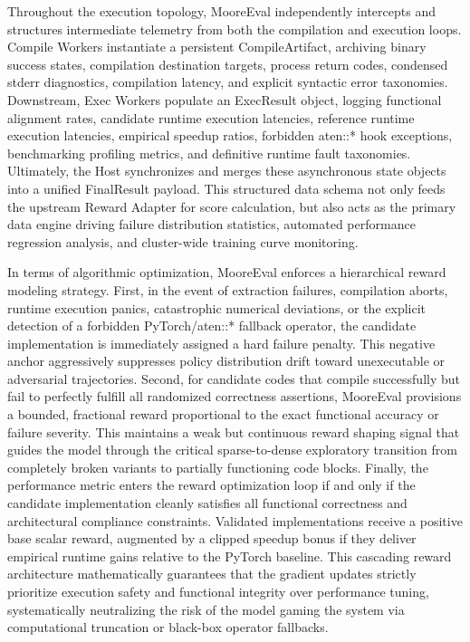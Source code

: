 \documentclass[
  10
]{article}
\begin{document}
Throughout the execution topology, MooreEval independently intercepts
and structures intermediate telemetry from both the compilation and
execution loops. Compile Workers instantiate a persistent
CompileArtifact, archiving binary success states, compilation
destination targets, process return codes, condensed stderr diagnostics,
compilation latency, and explicit syntactic error taxonomies.
Downstream, Exec Workers populate an ExecResult object, logging
functional alignment rates, candidate runtime execution latencies,
reference runtime execution latencies, empirical speedup ratios,
forbidden aten::* hook exceptions, benchmarking profiling metrics, and
definitive runtime fault taxonomies. Ultimately, the Host synchronizes
and merges these asynchronous state objects into a unified FinalResult
payload. This structured data schema not only feeds the upstream Reward
Adapter for score calculation, but also acts as the primary data engine
driving failure distribution statistics, automated performance
regression analysis, and cluster-wide training curve monitoring.

In terms of algorithmic optimization, MooreEval enforces a hierarchical
reward modeling strategy. First, in the event of extraction failures,
compilation aborts, runtime execution panics, catastrophic numerical
deviations, or the explicit detection of a forbidden PyTorch/aten::*
fallback operator, the candidate implementation is immediately assigned
a hard failure penalty. This negative anchor aggressively suppresses
policy distribution drift toward unexecutable or adversarial
trajectories. Second, for candidate codes that compile successfully but
fail to perfectly fulfill all randomized correctness assertions,
MooreEval provisions a bounded, fractional reward proportional to the
exact functional accuracy or failure severity. This maintains a weak but
continuous reward shaping signal that guides the model through the
critical sparse-to-dense exploratory transition from completely broken
variants to partially functioning code blocks. Finally, the performance
metric enters the reward optimization loop if and only if the candidate
implementation cleanly satisfies all functional correctness and
architectural compliance constraints. Validated implementations receive
a positive base scalar reward, augmented by a clipped speedup bonus if
they deliver empirical runtime gains relative to the PyTorch baseline.
This cascading reward architecture mathematically guarantees that the
gradient updates strictly prioritize execution safety and functional
integrity over performance tuning, systematically neutralizing the risk
of the model gaming the system via computational truncation or black-box
operator fallbacks.
\end{document}
